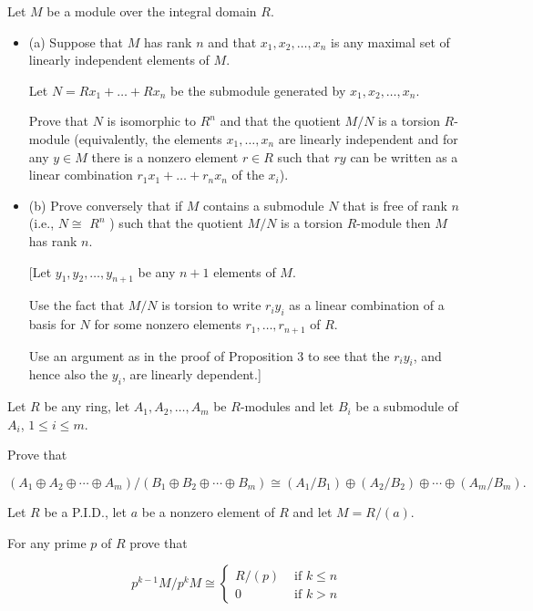 Let $M$ be a module over the integral domain $R$.
\begin{itemize}
    \item (a) Suppose that $M$ has rank $n$ and that $x_1, x_2, \ldots, x_n$ is any maximal set of linearly independent elements of $M$.

Let $N=R x_1+\ldots+R x_n$ be the submodule generated by $x_1, x_2, \ldots, x_n$.

Prove that $N$ is isomorphic to $R^n$ and that the quotient $M / N$ is a torsion $R$-module (equivalently, the elements $x_1, \ldots, x_n$ are linearly independent and for any $y \in M$ there is a nonzero element $r \in R$ such that $r y$ can be written as a linear combination $r_1 x_1+\ldots+r_n x_n$ of the $x_i$).

    \item (b) Prove conversely that if $M$ contains a submodule $N$ that is free of rank $n$ (i.e., $N \cong$ $R^n$ ) such that the quotient $M / N$ is a torsion $R$-module then $M$ has rank $n$.

[Let $y_1, y_2, \ldots, y_{n+1}$ be any $n+1$ elements of $M$.

Use the fact that $M / N$ is torsion to write $r_i y_i$ as a linear combination of a basis for $N$ for some nonzero elements $r_1, \ldots, r_{n+1}$ of $R$.

Use an argument as in the proof of Proposition 3 to see that the $r_i y_i$, and hence also the $y_i$, are linearly dependent.]

\end{itemize}

Let $R$ be any ring, let $A_1, A_2, \ldots, A_m$ be $R$-modules and let $B_i$ be a submodule of $A_i$, $1 \leq i \leq m$.

Prove that

$$
\left(A_1 \oplus A_2 \oplus \cdots \oplus A_m\right) /\left(B_1 \oplus B_2 \oplus \cdots \oplus B_m\right) \cong\left(A_1 / B_1\right) \oplus\left(A_2 / B_2\right) \oplus \cdots \oplus\left(A_m / B_m\right) \text {.
}
$$

Let $R$ be a P.I.D., let $a$ be a nonzero element of $R$ and let $M=R /(a)$.

For any prime $p$ of $R$ prove that

$$
p^{k-1} M / p^k M \cong \begin{cases}R /(p) & \text { if } k \leq n \\ 0 & \text { if } k>n\end{cases}
$$

